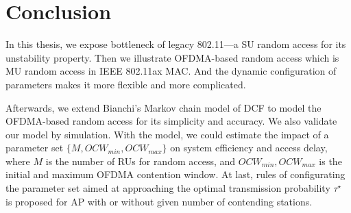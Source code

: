 \chapter{Conclusion}   \label{chp_conclu}
In this thesis, we expose bottleneck of legacy 802.11---a SU random access for its unstability property. 
Then we illustrate OFDMA-based random access which is MU random access in IEEE 802.11ax MAC. 
And the dynamic configuration of parameters makes it more flexible and more complicated. 

Afterwards, we extend Bianchi's Markov chain model of DCF to model the OFDMA-based random access for its simplicity and accuracy. We also validate our model by simulation. 
With the model, we could estimate the impact of a parameter set $\lbrace M, OCW_{min}, OCW_{max} \rbrace$ on system efficiency and access delay, where $M$ is the number of RUs for random access,  and $OCW_{min}, OCW_{max}$ is the initial and maximum OFDMA contention window. 
At last, rules of configurating the parameter set aimed at approaching the optimal transmission probability $\tau^\star$ is proposed for AP with or without given number of contending stations.